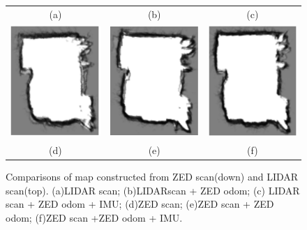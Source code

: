 \documentclass[english]{article}
\begin{document}
\begin{figure}[H]
\begin{tabular}{ccc}
         \\ (a) & (b) & (c) \\
         \includegraphics{Images/Plan_d.PNG} & 
         \includegraphics{Images/Plan_e.PNG} & 
         \includegraphics{Images/Plan_f.PNG} 
         \\ (d) & (e) & (f)
    \end{tabular}
    \captionsetup{width=18.5cm}
    \caption{Comparisons of map constructed from ZED scan(down) and LIDAR
    scan(top).  (a)LIDAR scan; (b)LIDARscan + ZED odom; (c) LIDAR scan +
    ZED odom + IMU; (d)ZED scan; (e)ZED scan + ZED odom; (f)ZED scan +ZED
    odom + IMU.}
    \label{fig:Schema_3}
\end{figure}
\end{document}
